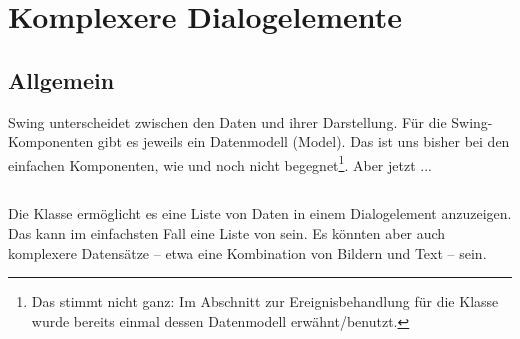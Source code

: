 \clearpage

\rehead[]{\textcolor{lightblue}{AvHG, Inf, My}}
\lohead[]{\textcolor{lightblue}{AvHG, Inf, My}}

\lstset{style=myJava}

\section{Komplexere Dialogelemente}

\subsection{Allgemein}

Swing unterscheidet zwischen den Daten und ihrer Darstellung. Für die
Swing-Komponenten gibt es jeweils ein Datenmodell (Model). Das ist uns bisher
bei den einfachen Komponenten, wie  und 
noch nicht begegnet\footnote{Das stimmt nicht ganz: Im Abschnitt zur
Ereignisbehandlung für die Klasse  wurde bereits einmal
dessen Datenmodell erwähnt/benutzt.}.
Aber jetzt ...

\subsection{}

Die Klasse  ermöglicht es eine Liste von Daten in einem
Dialogelement anzuzeigen. Das kann im einfachsten Fall eine Liste von
 sein. Es könnten aber auch komplexere Datensätze -- etwa eine
Kombination von Bildern und Text -- sein.

